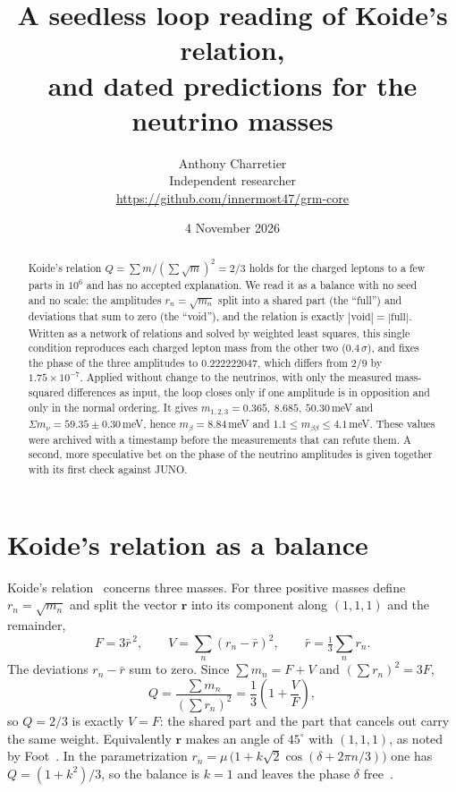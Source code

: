\documentclass[11pt,a4paper]{article}
\title{A seedless loop reading of Koide's relation,\\ and dated predictions for the neutrino masses}
\author{Anthony Charretier\\ \small Independent researcher\\ \small \url{https://github.com/innermost47/grm-core}}
\date{4 November 2026}
\begin{document}
\maketitle

\begin{abstract}
Koide's relation $Q=\sum m/(\sum\sqrt m)^2=2/3$ holds for the charged leptons to a few parts in $10^{6}$ and has no
accepted explanation. We read it as a balance with no seed and no scale: the amplitudes $r_n=\sqrt{m_n}$ split into a
shared part (the ``full'') and deviations that sum to zero (the ``void''), and the relation is exactly
$|\text{void}|=|\text{full}|$. Written as a network of relations and solved by weighted least squares, this single
condition reproduces each charged lepton mass from the other two (0.4\,$\sigma$), and fixes the phase of the three
amplitudes to $0.222222047$, which differs from $2/9$ by $1.75\times10^{-7}$. Applied without change to the neutrinos,
with only the measured mass-squared differences as input, the loop closes only if one amplitude is in opposition and
only in the normal ordering. It gives $m_{1,2,3}=0.365,\ 8.685,\ 50.30$\,meV and $\Sigma m_\nu=59.35\pm0.30$\,meV, hence
$m_\beta=8.84$\,meV and $1.1\le m_{\beta\beta}\le4.1$\,meV. These values were archived with a timestamp before the
measurements that can refute them. A second, more speculative bet on the phase of the neutrino amplitudes is given
together with its first check against JUNO.
\end{abstract}

\section{Koide's relation as a balance}
Koide's relation~\cite{koide} concerns three masses. For three positive masses define $r_n=\sqrt{m_n}$ and split the vector $\mathbf r$ into its component along
$(1,1,1)$ and the remainder,
\begin{equation}
  F=3\bar r^{\,2},\qquad V=\sum_n (r_n-\bar r)^2,\qquad \bar r=\tfrac13\sum_n r_n .
\end{equation}
The deviations $r_n-\bar r$ sum to zero. Since $\sum m_n=F+V$ and $(\sum r_n)^2=3F$,
\begin{equation}
  Q=\frac{\sum m_n}{(\sum r_n)^2}=\frac13\left(1+\frac VF\right),
\end{equation}
so $Q=2/3$ is exactly $V=F$: the shared part and the part that cancels out carry the same weight. Equivalently
$\mathbf r$ makes an angle of $45^\circ$ with $(1,1,1)$, as noted by Foot~\cite{foot}. In the parametrization
$r_n=\mu\,\bigl(1+k\sqrt2\cos(\delta+2\pi n/3)\bigr)$ one has $Q=(1+k^2)/3$, so the balance is $k=1$ and leaves the
phase $\delta$ free~\cite{brannen,zenczykowski}.
\end{document}
